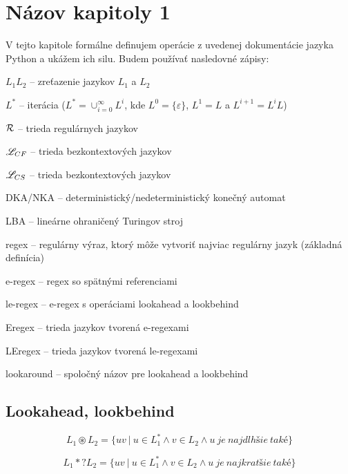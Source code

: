 \chapter{Názov kapitoly 1}
\label{chap:kapitola1}

V tejto kapitole formálne definujem operácie z uvedenej dokumentácie jazyka Python \cite{Python3Documentation} a ukážem ich silu. Budem používať nasledovné zápisy:
\begin{list}{}{}
\item $ L_{1}L_{2} $ -- zreťazenie jazykov $ L_{1} $ a $ L_{2} $
\item $ L^* $ -- iterácia ($L^*=\cup^{\infty}_{i=0}L^i$, kde $L^0=\lbrace \varepsilon \rbrace$, $L^1=L$ a $L^{i+1}=L^iL$)
\item $ {\cal R} $ -- trieda regulárnych jazykov
\item $ \mathscr{L}_{CF}$ -- trieda bezkontextových jazykov
\item $ \mathscr{L}_{CS}$ -- trieda bezkontextových jazykov
\item DKA/NKA -- deterministický/nedeterministický konečný automat
\item LBA -- lineárne ohraničený Turingov stroj
\item regex -- regulárny výraz, ktorý môže vytvoriť najviac regulárny jazyk (základná definícia)
\item e-regex -- regex so spätnými referenciami
\item le-regex -- e-regex s operáciami lookahead a lookbehind
\item Eregex -- trieda jazykov tvorená e-regexami
\item LEregex -- trieda jazykov tvorená le-regexami
\item lookaround -- spoločný názov pre lookahead a lookbehind
\end{list}

\section{Lookahead, lookbehind}
\label{chap:lookahead}

\begin{df}
$$ L_{1} \circledast L_{2} = \lbrace uv ~|~ u \in L_1^* \land v \in L_2 \land u~je~najdlhšie~také \rbrace$$
\end{df}

\begin{df}
$$ L_{1} *? L_{2} = \lbrace uv ~|~ u \in L_1^* \land v \in L_2 \land u~je~najkratšie~také \rbrace $$
\end{df}

